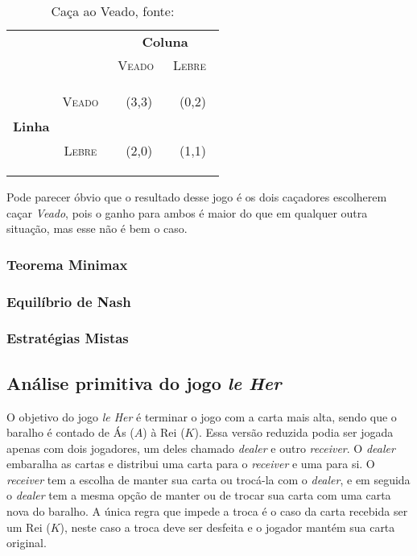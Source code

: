 \begin{table}[ht]
\centering
\begin{tabular}{|c|c|c|c|}
	\cline{3-4}
	\multicolumn{1}{c}{} &  & \multicolumn{2}{c|}{{\bfseries Coluna}}\tabularnewline
	\cline{3-4}
	\multicolumn{1}{c}{} &  & {\scshape Veado}\  & {\scshape Lebre}\ \tabularnewline
	\hline
	\multirow{2}{*}{\begin{turn}{90}
	{\bfseries Linha}
	\end{turn}} & \begin{turn}{90}
	{\scshape Veado}\
	\end{turn} & {\Large(3,3)} & {\Large(0,2)}\tabularnewline
	\cline{2-4}
	 & \begin{turn}{90}
	{\scshape Lebre}\
	\end{turn} & {\Large(2,0)} & {\Large(1,1)}\tabularnewline
	\hline
\end{tabular}
\caption{Caça ao Veado, fonte: \cite{spaniel_2011}}
\label{tab:caca-ao-viado}
\end{table}

Pode parecer óbvio que o resultado desse jogo é os dois caçadores escolherem caçar \emph{Veado}, pois o ganho para ambos é maior do que em qualquer outra situação, mas esse não é bem o caso.

\subsubsection{Teorema Minimax}
\label{subsubsec:teorema-minimax}

\subsubsection{Equilíbrio de Nash}
\label{subsubsec:equilibrio-de-nash}

\subsubsection{Estratégias Mistas}
\label{subsubsec:estrategias-mistas}


\subsection{Análise primitiva do jogo \emph{le Her}}
\label{subsec:analise-primitiva-do-jogo-le-her}

O objetivo do jogo \emph{le Her} é terminar o jogo com a carta mais alta, sendo que o baralho é contado de Ás ($A$) à Rei ($K$). Essa versão reduzida podia ser jogada apenas com dois jogadores, um deles chamado \emph{dealer} e outro \emph{receiver}. O \emph{dealer} embaralha as cartas e distribui uma carta para o \emph{receiver} e uma para si. O \emph{receiver} tem a escolha de manter sua carta ou trocá-la com o \emph{dealer}, e em seguida o \emph{dealer} tem a mesma opção de manter ou de trocar sua carta com uma carta nova do baralho. A única regra que impede a troca é o caso da carta recebida ser um Rei ($K$), neste caso a troca deve ser desfeita e o jogador mantém sua carta original.

